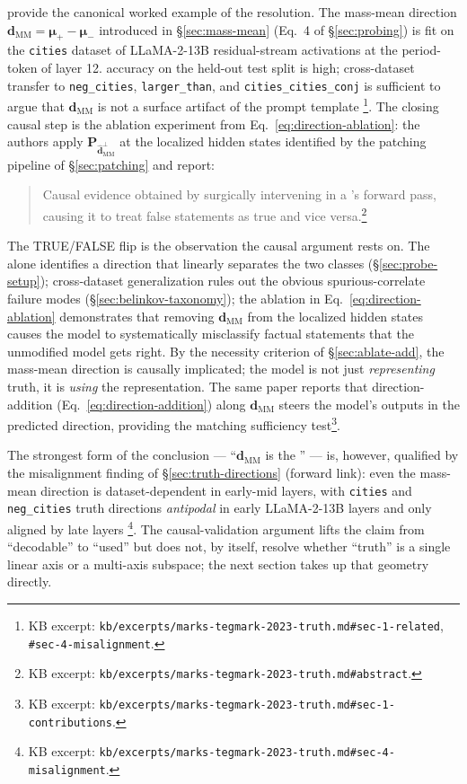 \citet{marks-tegmark-2023-truth} provide the canonical worked example
of the resolution. The mass-mean direction
$\mathbf{d}_{\mathrm{MM}} = \boldsymbol{\mu}_+ - \boldsymbol{\mu}_-$
introduced in \S\ref{sec:mass-mean} (Eq.~4 of \S\ref{sec:probing}) is
fit on the \texttt{cities} dataset of LLaMA-2-13B residual-stream
activations at the period-token of layer 12.  accuracy on the
held-out test split is high; cross-dataset transfer to
\texttt{neg\_cities}, \texttt{larger\_than}, and \texttt{cities\_cities\_conj}
is sufficient to argue that $\mathbf{d}_{\mathrm{MM}}$ is not a
surface artifact of the prompt template
\citep[\S 1.1, \S 4]{marks-tegmark-2023-truth}\footnote{KB excerpt:
\nolinkurl{kb/excerpts/marks-tegmark-2023-truth.md#sec-1-related},
\texttt{\#sec-4-misalignment}.}. The closing causal step is the
ablation experiment from Eq.~\eqref{eq:direction-ablation}: the
authors apply
$\mathbf{P}_{\hat{\mathbf{d}}_{\mathrm{MM}}^\perp}$ at the localized
hidden states identified by the patching pipeline of
\S\ref{sec:patching} and report:
\begin{quote}
Causal evidence obtained by surgically intervening in a 's forward
pass, causing it to treat false statements as true and vice
versa.\hfill\citep[abstract]{marks-tegmark-2023-truth}\footnote{KB
excerpt: \nolinkurl{kb/excerpts/marks-tegmark-2023-truth.md#abstract}.}
\end{quote}
The TRUE/FALSE flip is the observation the causal argument rests on. The  alone
identifies a direction that linearly separates the two classes
(\S\ref{sec:probe-setup}); cross-dataset generalization rules out the
obvious spurious-correlate failure modes (\S\ref{sec:belinkov-taxonomy});
the ablation in Eq.~\eqref{eq:direction-ablation} demonstrates that
removing $\mathbf{d}_{\mathrm{MM}}$ from the localized hidden states
causes the model to systematically misclassify factual statements
that the unmodified model gets right. By the necessity criterion of
\S\ref{sec:ablate-add}, the mass-mean direction is causally
implicated; the model is not just \emph{representing} truth, it is
\emph{using} the representation. The same paper reports that
direction-addition (Eq.~\eqref{eq:direction-addition}) along
$\mathbf{d}_{\mathrm{MM}}$ steers the model's outputs in the predicted
direction, providing the matching sufficiency
test\footnote{KB excerpt: \nolinkurl{kb/excerpts/marks-tegmark-2023-truth.md#sec-1-contributions}.}.

The strongest form of the conclusion --- ``$\mathbf{d}_{\mathrm{MM}}$
is the '' --- is, however, qualified by the misalignment
finding of \S\ref{sec:truth-directions} (forward link): even the
mass-mean direction is dataset-dependent in early-mid layers, with
\texttt{cities} and \texttt{neg\_cities} truth directions
\emph{antipodal} in early LLaMA-2-13B layers and only aligned by
late layers \citep[\S 4]{marks-tegmark-2023-truth}\footnote{KB excerpt:
\nolinkurl{kb/excerpts/marks-tegmark-2023-truth.md#sec-4-misalignment}.}.
The causal-validation argument lifts the claim from
``decodable'' to ``used'' but does not, by itself, resolve whether
``truth'' is a single linear axis or a multi-axis subspace; the next
section takes up that geometry directly.

